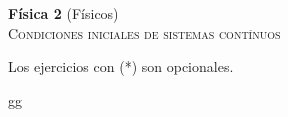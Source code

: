 \documentclass[11pt,spanish,a4paper]{article}
\begin{document}
\begin{center}
\textbf{Física 2} (Físicos) \hfill {}\\
\textsc{\LARGE Condiciones iniciales de sistemas contínuos}
\end{center}

Los ejercicios con (*) son opcionales.

\begin{enumerate}






gg
\end{enumerate}
\end{document}
